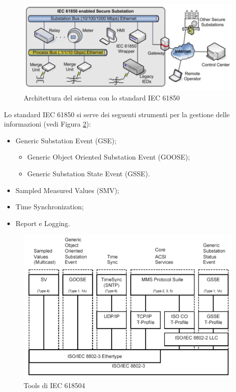 \begin{figure}[h]
	\centering
	\includegraphics[scale=0.450]{imgs/arch_iec61850.png}
	\caption{Architettura del sistema con lo standard IEC 61850} \label{fig:arch_iec61850}
\end{figure}
\newpage
Lo standard IEC 61850 si serve dei seguenti strumenti per la gestione delle informazioni (vedi Figura \ref{fig:tools_iec61850}):
\begin{itemize}
	\item Generic Substation Event (GSE);
	\begin{itemize}
		\item Generic Object Oriented Substation Event (GOOSE);
		\item Generic Substation State Event (GSSE).
	\end{itemize}
	\item Sampled Measured Values (SMV);
	\item Time Synchronization;
	\item Report e Logging.
\end{itemize}
\begin{figure}[h]
	\centering
	\includegraphics[scale=0.350]{imgs/tools_iec61850.png}
	\caption{Tools di IEC 618504} \label{fig:tools_iec61850}
\end{figure}

